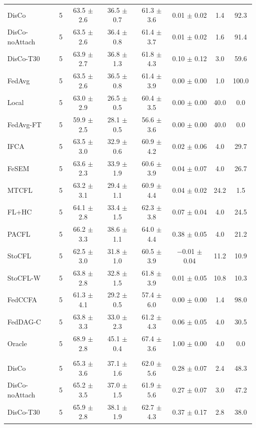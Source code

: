 {{\begin{tabular}{l r c c c c c c}
DisCo & 5 & 63.5 $\pm$ 2.6 & 36.5 $\pm$ 0.7 & 61.3 $\pm$ 3.6 & 0.01 $\pm$ 0.02 & 1.4 & 92.3 \\
DisCo-noAttach & 5 & 63.5 $\pm$ 2.6 & 36.4 $\pm$ 0.8 & 61.4 $\pm$ 3.7 & 0.01 $\pm$ 0.02 & 1.6 & 91.4 \\
DisCo-T30 & 5 & 63.9 $\pm$ 2.7 & 36.8 $\pm$ 1.3 & 61.8 $\pm$ 4.3 & 0.10 $\pm$ 0.12 & 3.0 & 59.6 \\
FedAvg & 5 & 63.5 $\pm$ 2.6 & 36.5 $\pm$ 0.8 & 61.4 $\pm$ 3.9 & 0.00 $\pm$ 0.00 & 1.0 & 100.0 \\
Local & 5 & 63.0 $\pm$ 2.9 & 26.5 $\pm$ 0.5 & 60.4 $\pm$ 3.5 & 0.00 $\pm$ 0.00 & 40.0 & 0.0 \\
FedAvg-FT & 5 & 59.9 $\pm$ 2.5 & 28.1 $\pm$ 0.5 & 56.6 $\pm$ 3.6 & 0.00 $\pm$ 0.00 & 40.0 & 0.0 \\
IFCA & 5 & 63.5 $\pm$ 3.0 & 32.9 $\pm$ 0.6 & 60.9 $\pm$ 4.2 & 0.02 $\pm$ 0.06 & 4.0 & 29.7 \\
FeSEM & 5 & 63.6 $\pm$ 2.3 & 33.9 $\pm$ 1.9 & 60.6 $\pm$ 3.9 & 0.04 $\pm$ 0.07 & 4.0 & 26.7 \\
MTCFL & 5 & 63.2 $\pm$ 3.1 & 29.4 $\pm$ 1.1 & 60.9 $\pm$ 4.4 & 0.04 $\pm$ 0.02 & 24.2 & 1.5 \\
FL+HC & 5 & 64.1 $\pm$ 2.8 & 33.4 $\pm$ 1.5 & 62.3 $\pm$ 3.8 & 0.07 $\pm$ 0.04 & 4.0 & 24.5 \\
PACFL & 5 & 66.2 $\pm$ 3.3 & 38.6 $\pm$ 1.1 & 64.0 $\pm$ 4.4 & 0.38 $\pm$ 0.05 & 4.0 & 21.2 \\
StoCFL & 5 & 62.5 $\pm$ 3.0 & 31.8 $\pm$ 1.0 & 60.5 $\pm$ 3.9 & $-$0.01 $\pm$ 0.04 & 11.2 & 10.9 \\
StoCFL-W & 5 & 63.8 $\pm$ 2.8 & 32.8 $\pm$ 1.5 & 61.8 $\pm$ 3.9 & 0.01 $\pm$ 0.05 & 10.8 & 10.3 \\
FedCCFA & 5 & 61.3 $\pm$ 4.1 & 29.2 $\pm$ 0.5 & 57.4 $\pm$ 6.0 & 0.00 $\pm$ 0.00 & 1.4 & 98.0 \\
FedDAG-C & 5 & 63.8 $\pm$ 3.3 & 33.0 $\pm$ 2.3 & 61.2 $\pm$ 4.3 & 0.06 $\pm$ 0.05 & 4.0 & 30.5 \\
Oracle & 5 & 68.9 $\pm$ 2.8 & 45.1 $\pm$ 0.4 & 67.4 $\pm$ 3.6 & 1.00 $\pm$ 0.00 & 4.0 & 0.0 \\
\addlinespace
\multicolumn{8}{l}{\textit{CIFAR-10 label swap}} \\
DisCo & 5 & 65.3 $\pm$ 3.6 & 37.1 $\pm$ 1.6 & 62.0 $\pm$ 5.6 & 0.28 $\pm$ 0.07 & 2.4 & 48.3 \\
DisCo-noAttach & 5 & 65.2 $\pm$ 3.5 & 37.0 $\pm$ 1.5 & 61.9 $\pm$ 5.6 & 0.27 $\pm$ 0.07 & 3.0 & 47.2 \\
DisCo-T30 & 5 & 65.9 $\pm$ 2.8 & 38.1 $\pm$ 1.9 & 62.7 $\pm$ 4.3 & 0.37 $\pm$ 0.17 & 2.8 & 38.0 \\

\end{tabular}}}
